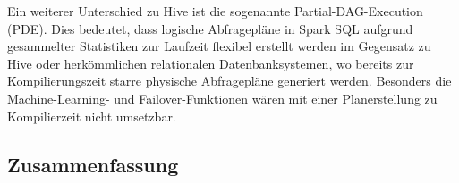 Ein weiterer Unterschied zu Hive ist die sogenannte Partial-DAG-Execution (PDE). Dies bedeutet, dass logische Abfragepläne in Spark SQL aufgrund gesammelter Statistiken zur Laufzeit flexibel erstellt werden im Gegensatz zu Hive oder herkömmlichen relationalen Datenbanksystemen, wo bereits zur Kompilierungszeit starre physische Abfragepläne generiert werden. Besonders die Machine-Learning- und Failover-Funktionen wären mit einer Planerstellung zu Kompilierzeit nicht umsetzbar. 






\subsection{Zusammenfassung}
\label{section:storm}




